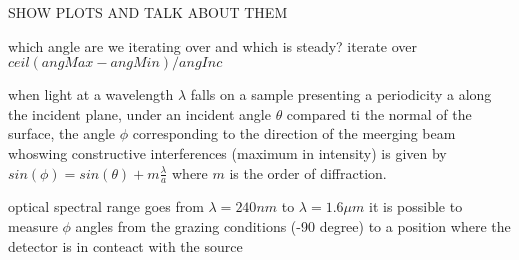 SHOW PLOTS AND TALK ABOUT THEM


which angle are we iterating over and which is steady?
iterate over $ceil(angMax - angMin) / angInc$

when light at a wavelength $\lambda$ falls on a sample presenting a periodicity a along the incident plane, under an incident angle $\theta$ compared ti the normal of the surface, the angle $\phi$ corresponding to the direction of the meerging beam whoswing constructive interferences (maximum in intensity) is given by $sin(\phi) = sin(\theta) + m\frac{\lambda}{a}$
where $m$ is the order of diffraction. 


optical spectral range goes from $\lambda=240 nm$ to $\lambda=1.6 \mu m$
it is possible to measure $\phi$ angles from the grazing conditions (-90 degree) to a position where the detector is in conteact with the source





















